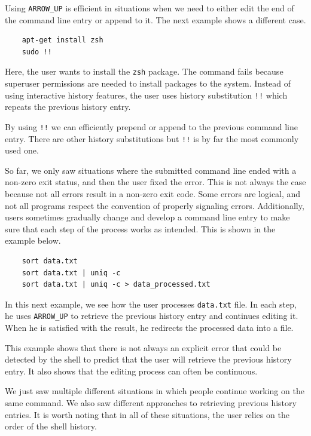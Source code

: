 Using \verb|ARROW_UP| is efficient in situations when we need to either edit the end of the command line entry or append to it.
The next example shows a different case.

\begin{verbatim}
    apt-get install zsh
    sudo !!
\end{verbatim}

Here, the user wants to install the \verb|zsh| package. The command fails because superuser permissions are needed to install packages to the system. Instead of using interactive history features, the user uses history substitution \verb|!!| which repeats the previous history entry. 

By using \verb|!!| we can efficiently prepend or append to the previous command line entry. There are other history substitutions but \verb|!!| is by far the most commonly used one. 

So far, we only saw situations where the submitted command line ended with a non-zero exit status, and then the user fixed the error. This is not always the case because not all errors result in a non-zero exit code. Some errors are logical, and not all programs respect the convention of properly signaling errors. Additionally, users sometimes gradually change and develop a command line entry to make sure that each step of the process works as intended. This is shown in the example below.

\begin{verbatim}
    sort data.txt
    sort data.txt | uniq -c
    sort data.txt | uniq -c > data_processed.txt
\end{verbatim}

In this next example, we see how the user processes \verb|data.txt| file. In each step, he uses \verb|ARROW_UP| to retrieve the previous history entry and continues editing it. When he is satisfied with the result, he redirects the processed data into a file. 

This example shows that there is not always an explicit error that could be detected by the shell to predict that the user will retrieve the previous history entry. It also shows that the editing process can often be continuous.

We just saw multiple different situations in which people continue working on the same command. We also saw different approaches to retrieving previous history entries. It is worth noting that in all of these situations, the user relies on the order of the shell history. 

